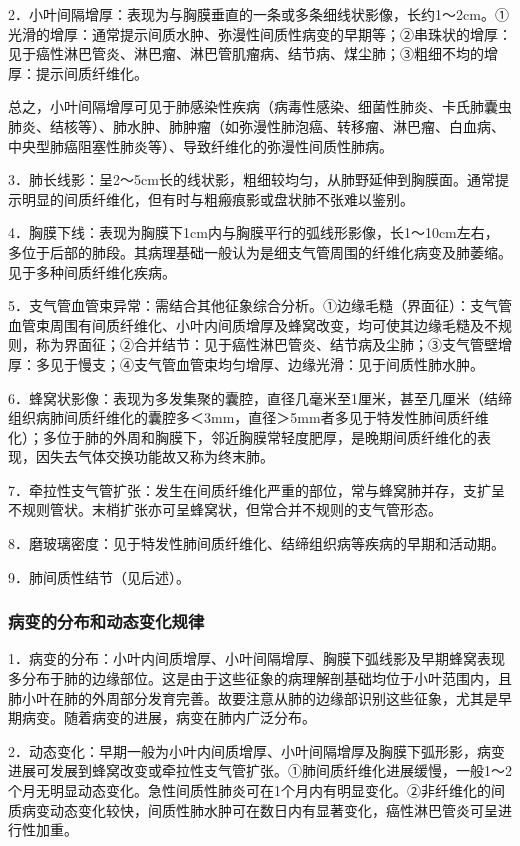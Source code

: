2．小叶间隔增厚：表现为与胸膜垂直的一条或多条细线状影像，长约1～2cm。①光滑的增厚：通常提示间质水肿、弥漫性间质性病变的早期等；②串珠状的增厚：见于癌性淋巴管炎、淋巴瘤、淋巴管肌瘤病、结节病、煤尘肺；③粗细不均的增厚：提示间质纤维化。

总之，小叶间隔增厚可见于肺感染性疾病（病毒性感染、细菌性肺炎、卡氏肺囊虫肺炎、结核等）、肺水肿、肺肿瘤（如弥漫性肺泡癌、转移瘤、淋巴瘤、白血病、中央型肺癌阻塞性肺炎等）、导致纤维化的弥漫性间质性肺病。

3．肺长线影：呈2～5cm长的线状影，粗细较均匀，从肺野延伸到胸膜面。通常提示明显的间质纤维化，但有时与粗瘢痕影或盘状肺不张难以鉴别。

4．胸膜下线：表现为胸膜下1cm内与胸膜平行的弧线形影像，长1～10cm左右，多位于后部的肺段。其病理基础一般认为是细支气管周围的纤维化病变及肺萎缩。见于多种间质纤维化疾病。

5．支气管血管束异常：需结合其他征象综合分析。①边缘毛糙（界面征）：支气管血管束周围有间质纤维化、小叶内间质增厚及蜂窝改变，均可使其边缘毛糙及不规则，称为界面征；②合并结节：见于癌性淋巴管炎、结节病及尘肺；③支气管壁增厚：多见于慢支；④支气管血管束均匀增厚、边缘光滑：见于间质性肺水肿。

6．蜂窝状影像：表现为多发集聚的囊腔，直径几毫米至1厘米，甚至几厘米（结缔组织病肺间质纤维化的囊腔多＜3mm，直径＞5mm者多见于特发性肺间质纤维化）；多位于肺的外周和胸膜下，邻近胸膜常轻度肥厚，是晚期间质纤维化的表现，因失去气体交换功能故又称为终末肺。

7．牵拉性支气管扩张：发生在间质纤维化严重的部位，常与蜂窝肺并存，支扩呈不规则管状。末梢扩张亦可呈蜂窝状，但常合并不规则的支气管形态。

8．磨玻璃密度：见于特发性肺间质纤维化、结缔组织病等疾病的早期和活动期。

9．肺间质性结节（见后述）。

\subsubsection{病变的分布和动态变化规律}

1．病变的分布：小叶内间质增厚、小叶间隔增厚、胸膜下弧线影及早期蜂窝表现多分布于肺的边缘部位。这是由于这些征象的病理解剖基础均位于小叶范围内，且肺小叶在肺的外周部分发育完善。故要注意从肺的边缘部识别这些征象，尤其是早期病变。随着病变的进展，病变在肺内广泛分布。

2．动态变化：早期一般为小叶内间质增厚、小叶间隔增厚及胸膜下弧形影，病变进展可发展到蜂窝改变或牵拉性支气管扩张。①肺间质纤维化进展缓慢，一般1～2个月无明显动态变化。急性间质性肺炎可在1个月内有明显变化。②非纤维化的间质病变动态变化较快，间质性肺水肿可在数日内有显著变化，癌性淋巴管炎可呈进行性加重。


